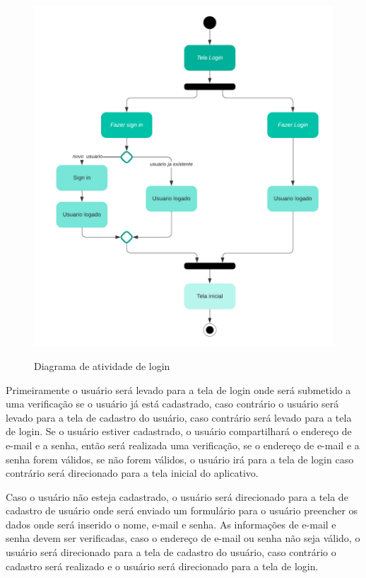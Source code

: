 \begin{figure}[H]
  \begin{center}
        \caption{Diagrama de atividade de login} \label{afp}
        \includegraphics[width=15cm]{Pictures/diagram/atividade.png} \\


  \end{center}
\end{figure}
Primeiramente o usuário será levado para a tela de login onde será submetido a uma verificação se o usuário já está cadastrado, caso contrário o usuário será levado para a tela de cadastro do usuário, caso contrário será levado para a tela de login. Se o usuário estiver cadastrado, o usuário compartilhará o endereço de e-mail e a senha, então será realizada uma verificação, se o endereço de e-mail e a senha forem válidos, se não forem válidos, o usuário irá para a tela de login caso contrário será direcionado para a tela inicial do aplicativo.

Caso o usuário não esteja cadastrado, o usuário será direcionado para a tela de cadastro de usuário onde será enviado um formulário para o usuário preencher os dados onde será inserido o nome, e-mail e senha. As informações de e-mail e senha devem ser verificadas, caso o endereço de e-mail ou senha não seja válido, o usuário será direcionado para a tela de cadastro do usuário, caso contrário o cadastro será realizado e o usuário será direcionado para a tela de login.
